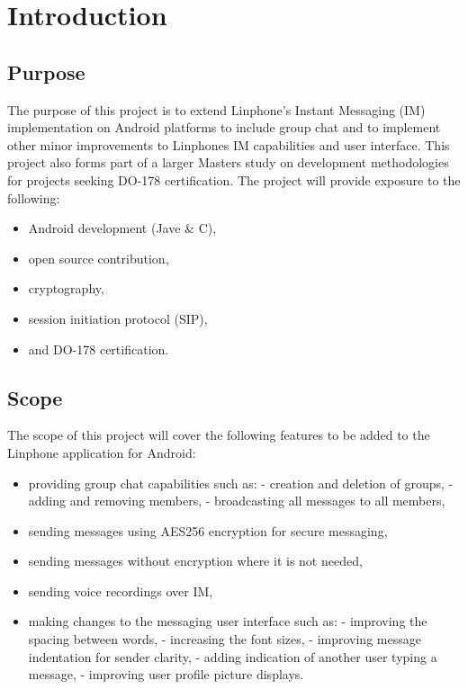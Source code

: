 \documentclass[11pt]{article}
\begin{document}
\newpage
\section{Introduction}
\subsection{Purpose}
The purpose of this project is to extend Linphone's Instant Messaging (IM) implementation on Android platforms to include group chat and to implement other minor improvements to Linphones IM capabilities and user interface. \newline
This project also forms part of a larger Masters study on development methodologies for projects seeking DO-178 certification.
\newline \newline
The project will provide exposure to the following:
\begin{itemize}
\item Android development (Jave \& C),
\item open source contribution,
\item cryptography,
\item session initiation protocol (SIP),
\item and DO-178 certification.
\end{itemize}

\subsection{Scope}
The scope of this project will cover the following features to be added to the Linphone application for Android:
\begin{itemize}
\item providing group chat capabilities such as:
\subitem  - creation and deletion of groups,
\subitem  - adding and removing members,
\subitem  - broadcasting all messages to all members,
\item sending messages using AES256 encryption for secure messaging,
\item sending messages without encryption where it is not needed,
\item sending voice recordings over IM,
\item making changes to the messaging user interface such as:
\subitem  - improving the spacing between words,
\subitem  - increasing the font sizes,
\subitem  - improving message indentation for sender clarity,
\subitem  - adding indication of another user typing a message,
\subitem  - improving user profile picture displays.
\end{itemize}
\end{document}
